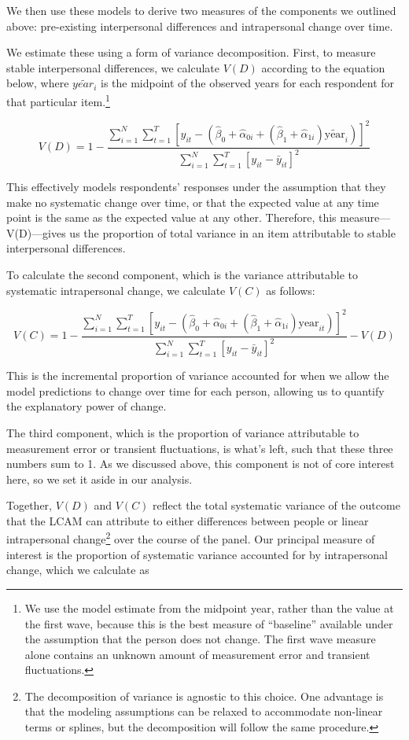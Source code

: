 \documentclass[
  11pt,
]{article}
\begin{document}
We then use these models to derive two measures of the components we
outlined above: pre-existing interpersonal differences and intrapersonal
change over time.

We estimate these using a form of variance decomposition. First, to
measure stable interpersonal differences, we calculate \(V(D)\)
according to the equation below, where \(\widetilde{year_i}\) is the
midpoint of the observed years for each respondent for that particular
item.\footnote{We use the model estimate from the midpoint year, rather
  than the value at the first wave, because this is the best measure of
  ``baseline'' available under the assumption that the person does not
  change. The first wave measure alone contains an unknown amount of
  measurement error and transient fluctuations.}

\[
V(D) = 1 - \frac{\sum_{i=1}^N \sum_{t=1}^T [y_{it} - (\hat{\beta}_0 + \hat{\alpha}_{0i} + (\hat{\beta}_1 + \hat{\alpha}_{1i}) \widetilde{\text{year}}_{i})]^2}{\sum_{i=1}^N \sum_{t=1}^T [y_{it} - \bar{y}_{it}]^2}
\]

This effectively models respondents' responses under the assumption that
they make no systematic change over time, or that the expected value at
any time point is the same as the expected value at any other.
Therefore, this measure---V(D)---gives us the proportion of total
variance in an item attributable to stable interpersonal differences.

To calculate the second component, which is the variance attributable to
systematic intrapersonal change, we calculate \(V(C)\) as follows:

\[
V(C) = 1 - \frac{\sum_{i=1}^N \sum_{t=1}^T [y_{it} - (\hat{\beta}_0 + \hat{\alpha}_{0i} + (\hat{\beta}_1 + \hat{\alpha}_{1i}) \text{year}_{it})]^2}{\sum_{i=1}^N \sum_{t=1}^T [y_{it} - \bar{y}_{it}]^2} - V(D)
\]

This is the incremental proportion of variance accounted for when we
allow the model predictions to change over time for each person,
allowing us to quantify the explanatory power of change.

The third component, which is the proportion of variance attributable to
measurement error or transient fluctuations, is what's left, such that
these three numbers sum to 1. As we discussed above, this component is
not of core interest here, so we set it aside in our analysis.

Together, \(V(D)\) and \(V(C)\) reflect the total systematic variance of
the outcome that the LCAM can attribute to either differences between
people or linear intrapersonal change\footnote{The decomposition of
  variance is agnostic to this choice. One advantage is that the
  modeling assumptions can be relaxed to accommodate non-linear terms or
  splines, but the decomposition will follow the same procedure.} over
the course of the panel. Our principal measure of interest is the
proportion of systematic variance accounted for by intrapersonal change,
which we calculate as
\end{document}
